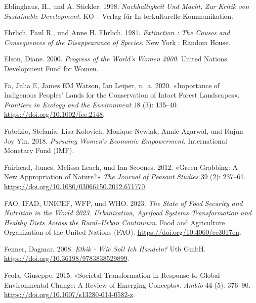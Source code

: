 \documentclass[
  nswissgerman,
  a4paper,
  openany]{book}
\newlength{\cslhangindent}
\newenvironment{CSLReferences}[2] %
 {\begin{list}{}{%
  \setlength{\itemindent}{0pt}
  \setlength{\leftmargin}{0pt}
  \setlength{\parsep}{0pt}
  \ifodd #1
   \setlength{\leftmargin}{\cslhangindent}
   \setlength{\itemindent}{-1\cslhangindent}
  \fi
  \setlength{\itemsep}{#2\baselineskip}}}
 {\end{list}}
\begin{document}
\begin{CSLReferences}{1}{1}
Eblinghaus, H., und A. Stickler. 1998. \emph{Nachhaltigkeit Und {Macht}.
{Zur Kritik} von {Sustainable Development}}. KO -- Verlag für
In-terkulturelle Kommunikation.

Ehrlich, Paul R., und Anne H. Ehrlich. 1981. \emph{Extinction : The
Causes and Consequences of the Disappearance of Species}. New York :
Random House.

Elson, Diane. 2000. \emph{Progress of the World's Women 2000}. United
Nations Development Fund for Women.

Fa, Julia E, James EM Watson, Ian Leiper, u.~a. 2020. {«Importance of
{Indigenous Peoples}' Lands for the Conservation of {Intact Forest
Landscapes}»}. \emph{Frontiers in Ecology and the Environment} 18 (3):
135--40. \url{https://doi.org/10.1002/fee.2148}.

Fabrizio, Stefania, Lisa Kolovich, Monique Newiak, Annie Agarwal, und
Rujun Joy Yin. 2018. \emph{Pursuing {Women}'s {Economic Empowerment}}.
International Monetary Fund (IMF).

Fairhead, James, Melissa Leach, und Ian Scoones. 2012. {«Green
{Grabbing}: A New Appropriation of Nature?»} \emph{The Journal of
Peasant Studies} 39 (2): 237--61.
\url{https://doi.org/10.1080/03066150.2012.671770}.

FAO, IFAD, UNICEF, WFP, und WHO. 2023. \emph{The {State} of {Food
Security} and {Nutrition} in the {World} 2023. {Urbanization}, Agrifood
Systems Transformation and Healthy Diets Across the Rural--Urban
Continuum}. {Food and Agriculture Organization of the United Nations
(FAO)}. \url{https://doi.org/10.4060/cc3017en}.

Fenner, Dagmar. 2008. \emph{Ethik - {Wie} Soll Ich Handeln?} Utb GmbH.
\url{https://doi.org/10.36198/9783838529899}.

Feola, Giuseppe. 2015. {«Societal Transformation in Response to Global
Environmental Change: {A} Review of Emerging Concepts»}. \emph{Ambio} 44
(5): 376--90. \url{https://doi.org/10.1007/s13280-014-0582-z}.


\end{CSLReferences}
\end{document}
